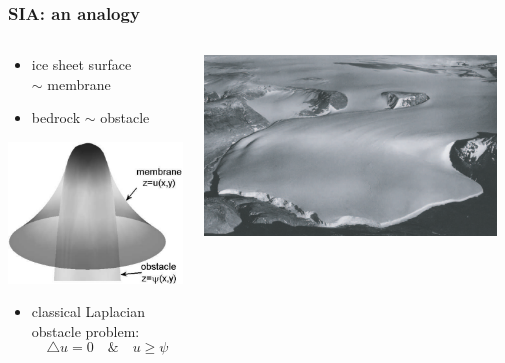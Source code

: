 \documentclass[hide notes,intlimits]{beamer}
\newcommand{\lap}{\triangle}
\begin{document}
\begin{frame}
  \frametitle{SIA: an analogy}
\begin{columns}
\begin{column}{0.4\textwidth}
\begin{itemize}
\item ice sheet surface \\ $\sim$ \alert{membrane}
\item bedrock $\sim$ \alert{obstacle}
\end{itemize}
\begin{center}
\vspace{-2mm}
\includegraphics[width=\textwidth]{classicalobs}
\begin{itemize}
\item classical Laplacian obstacle problem:
   $$\lap u = 0 \quad \& \quad u\ge \psi$$
\end{itemize}
\end{center}
\end{column}
\begin{column}{0.55\textwidth}
\begin{center}
\includegraphics[width=0.95\textwidth]{polaris} \\

\end{center}
\end{column}
\end{columns}
\end{frame}
\end{document}
